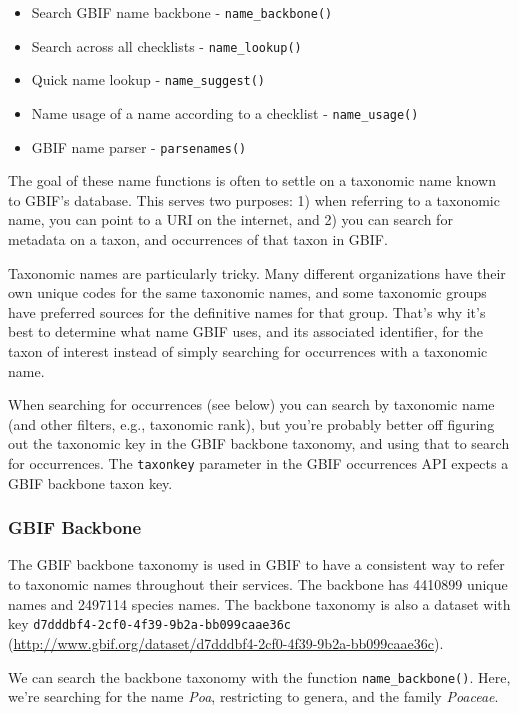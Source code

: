 \documentclass[author-year, review, 11pt]{components/elsarticle} %
\begin{document}
\begin{itemize}
\itemsep1pt\parskip0pt
\item
  Search GBIF name backbone - \texttt{name\_backbone()}
\item
  Search across all checklists - \texttt{name\_lookup()}
\item
  Quick name lookup - \texttt{name\_suggest()}
\item
  Name usage of a name according to a checklist - \texttt{name\_usage()}
\item
  GBIF name parser - \texttt{parsenames()}
\end{itemize}

The goal of these name functions is often to settle on a taxonomic name
known to GBIF's database. This serves two purposes: 1) when referring to
a taxonomic name, you can point to a URI on the internet, and 2) you can
search for metadata on a taxon, and occurrences of that taxon in GBIF.

Taxonomic names are particularly tricky. Many different organizations
have their own unique codes for the same taxonomic names, and some
taxonomic groups have preferred sources for the definitive names for
that group. That's why it's best to determine what name GBIF uses, and
its associated identifier, for the taxon of interest instead of simply
searching for occurrences with a taxonomic name.

When searching for occurrences (see below) you can search by taxonomic
name (and other filters, e.g., taxonomic rank), but you're probably
better off figuring out the taxonomic key in the GBIF backbone taxonomy,
and using that to search for occurrences. The \texttt{taxonkey}
parameter in the GBIF occurrences API expects a GBIF backbone taxon key.

\subsubsection{GBIF Backbone}\label{gbif-backbone}

The GBIF backbone taxonomy is used in GBIF to have a consistent way to
refer to taxonomic names throughout their services. The backbone has
4410899 unique names and 2497114 species names. The backbone taxonomy is
also a dataset with key \texttt{d7dddbf4-2cf0-4f39-9b2a-bb099caae36c}
(\url{http://www.gbif.org/dataset/d7dddbf4-2cf0-4f39-9b2a-bb099caae36c}).

We can search the backbone taxonomy with the function
\texttt{name\_backbone()}. Here, we're searching for the name
\emph{Poa}, restricting to genera, and the family \emph{Poaceae}.
\end{document}
